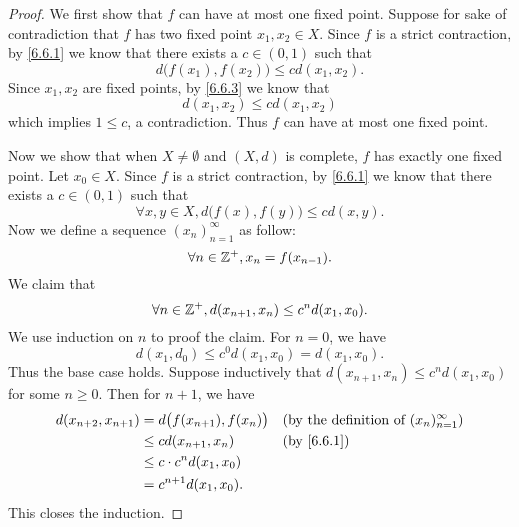 \begin{proof}
  We first show that \(f\) can have at most one fixed point.
  Suppose for sake of contradiction that \(f\) has two fixed point \(x_1, x_2 \in X\).
  Since \(f\) is a strict contraction, by \cref{6.6.1} we know that there exists a \(c \in (0, 1)\) such that
  \[
    d\big(f(x_1), f(x_2)\big) \leq c d(x_1, x_2).
  \]
  Since \(x_1, x_2\) are fixed points, by \cref{6.6.3} we know that
  \[
    d(x_1, x_2) \leq c d(x_1, x_2)
  \]
  which implies \(1 \leq c\), a contradiction.
  Thus \(f\) can have at most one fixed point.

  Now we show that when \(X \neq \emptyset\) and \((X, d)\) is complete, \(f\) has exactly one fixed point.
  Let \(x_0 \in X\).
  Since \(f\) is a strict contraction, by \cref{6.6.1} we know that there exists a \(c \in (0, 1)\) such that
  \[
    \forall x, y \in X, d\big(f(x), f(y)\big) \leq c d(x, y).
  \]
  Now we define a sequence \((x_n)_{n = 1}^\infty\) as follow:
  \[
    \forall n \in \mathbb{Z}^+, x_n = f(x_{n - 1}).
  \]
  We claim that
  \[
    \forall n \in \mathbb{Z}^+, d(x_{n + 1}, x_n) \leq c^n d(x_1, x_0).
  \]
  We use induction on \(n\) to proof the claim.
  For \(n = 0\), we have
  \[
    d(x_1, d_0) \leq c^0 d(x_1, x_0) = d(x_1, x_0).
  \]
  Thus the base case holds.
  Suppose inductively that \(d(x_{n + 1}, x_n) \leq c^n d(x_1, x_0)\) for some \(n \geq 0\).
  Then for \(n + 1\), we have
  \begin{align*}
    d(x_{n + 2}, x_{n + 1}) & = d\big(f(x_{n + 1}), f(x_n)\big) &  & \text{(by the definition of \((x_n)_{n = 1}^\infty\))} \\
                            & \leq c d(x_{n + 1}, x_n)          &  & \by{6.6.1}                                             \\
                            & \leq c \cdot c^n d(x_1, x_0)                                                                  \\
                            & = c^{n + 1} d(x_1, x_0).
  \end{align*}
  This closes the induction.


\end{proof}
